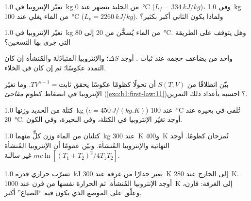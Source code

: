 \begin{exercise}[$\star$]\label{exo:b1:second-law-entropy:1}
تغيّر الإنتروبيا في \qty{1.0}{kg} من الجليد ينصهر عند \qty{0}{\degreeCelsius}
($L_f = \qty{334}{kJ/kg}$)، وفي \qty{1.0}{kg} من الماء يغلي عند
\qty{100}{\degreeCelsius} ($L_v = \qty{2260}{kJ/kg}$). ولماذا يكون الثاني
أكبر بكثير؟
\end{exercise}

\begin{exercise}[$\star$]\label{exo:b1:second-law-entropy:2}
تغيّر الإنتروبيا في \qty{1.0}{kg} من الماء يُسخَّن من \qty{20}{} إلى
\qty{80}{\degreeCelsius}. وهل يتوقف على الطريقة التي جرى بها التسخين؟
\end{exercise}

\begin{exercise}[$\star$]\label{exo:b1:second-law-entropy:3}
 واحد من  يضاعف حجمه عند ثبات .
أوجد $\Delta S$؛ والإنتروبيا المتبادَلة والمُنشأة إن كان التمدد عكوسًا؛
ثم إن كان  في الخلاء.
\end{exercise}

\begin{exercise}[$\star$]\label{exo:b1:second-law-entropy:4}
بيّن انطلاقًا من $S(T, V)$ أن تحولًا كظومًا عكوسًا  يحقق $TV^{\gamma - 1} = \text{ثابت}$. وما تغيّر الإنتروبيا في
انضغاط كظوم \emph{مفاجئ} (\cref{exo:b1:first-law:11})؟
احسبه بأعداد ذلك التمرين.
\end{exercise}

\begin{exercise}[$\star\star$]\label{exo:b1:second-law-entropy:5}
كتلة من الحديد وزنها \qty{1.0}{kg} ($c = \qty{450}{J/(kg.K)}$) عند \qty{100}{\degreeCelsius}
تُلقى في بحيرة عند \qty{20}{\degreeCelsius}. أوجد تغيّر الإنتروبيا في
الكتلة، وفي البحيرة، وفي الكون.
\end{exercise}

\begin{exercise}[$\star\star$]\label{exo:b1:second-law-entropy:6}
كتلتان من الماء وزن كلٍّ منهما \qty{1.0}{kg} عند \qty{300}{K} و\qty{400}{K} تُمزجان
كظومًا. أوجد  النهائية والإنتروبيا المُنشأة. وبيّن عمومًا أن
الإنتروبيا المُنشأة $mc\ln[(T_1 + T_2)^2/4T_1T_2]$ غير سالبة.
\end{exercise}

\begin{exercise}[$\star\star$]\label{exo:b1:second-law-entropy:7}
تسرّب حراري قدره \qty{1.0}{kJ} يعبر جدارًا من غرفة عند \qty{300}{K} إلى
الخارج عند \qty{280}{K}. أوجد الإنتروبيا المُنشأة. ثم الحرارة نفسها من فرن
عند \qty{1000}{K} إلى الغرفة: قارن، وعلّق على الموضع الذي يكون فيه
``الضياع'' أكبر.
\end{exercise}

